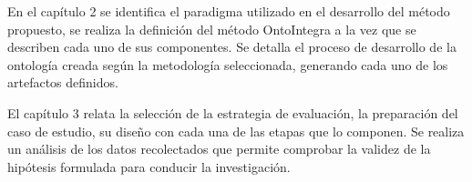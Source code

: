 En el capítulo 2 se identifica el paradigma utilizado en el desarrollo del método propuesto, se realiza la definición del método OntoIntegra a la vez que se describen cada uno de sus componentes. Se detalla el proceso de desarrollo de la ontología creada según la metodología seleccionada, generando cada uno de los artefactos definidos.

El capítulo 3 relata la selección de la estrategia de evaluación, la preparación del caso de estudio, su diseño con cada una de las etapas que lo componen. Se realiza un análisis de los datos recolectados que permite comprobar la validez de la hipótesis formulada para conducir la investigación.